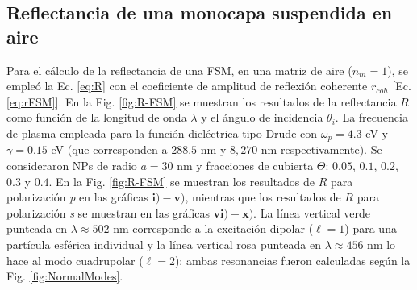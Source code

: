 \documentclass[letterpaper,11pt] {article}
\begin{document}
	\subsection{Reflectancia de una monocapa suspendida en aire}
	
	
Para el cálculo de la reflectancia de una FSM, en una matriz de aire ($n_m=1$), se empleó la Ec.  \eqref{eq:R} con el coeficiente de amplitud de reflexión coherente $r_{coh}$ [Ec.  \eqref{eq:rFSM}].  En la Fig.  \ref{fig:R-FSM} se muestran los resultados de la reflectancia $R$ como función de la longitud de onda $\lambda$ y el ángulo de incidencia $\theta_i$.  La frecuencia de plasma empleada para la función dieléctrica tipo Drude con $\omega_p = 4. 3$ eV y $\gamma = 0. 15$ eV (que corresponden a $288. 5$ nm  y $8,270$ nm respectivamente). Se consideraron NPs de radio $a=30$ nm y fracciones de cubierta $\Theta$: $0. 05$, $0. 1$, $0. 2$, $0. 3$ y $0. 4$. En la Fig.  \ref{fig:R-FSM} se muestran los resultados de $R$ para polarización \emph{p}  en las gráficas $\mathbf{i)-v)}$, mientras que los resultados de $R$ para polarización \emph{s} se muestran en las gráficas $\mathbf{vi)-x)}$. La línea vertical verde punteada en $\lambda \approx 502$ nm corresponde a la excitación dipolar ($\ell = 1$) para una partícula esférica individual y la línea vertical rosa punteada en $\lambda \approx 456$ nm lo hace al modo cuadrupolar ($\ell=2$); ambas resonancias fueron calculadas según la Fig.  \ref{fig:NormalModes}. 
					
\end{document}
